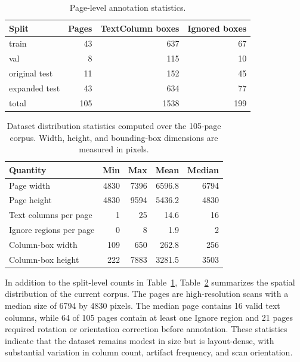 \documentclass[12pt]{article}
\begin{document}
\begin{table}[t]
\centering
\scriptsize\setlength{\tabcolsep}{3pt}
\caption{Page-level annotation statistics.}
\label{tab:data_stats}
\begin{tabular}{lrrr}
\toprule
Split & Pages & TextColumn boxes & Ignored boxes \\
\midrule
train & 43 & 637 & 67 \\
val & 8 & 115 & 10 \\
original test & 11 & 152 & 45 \\
expanded test & 43 & 634 & 77 \\
\midrule
total & 105 & 1538 & 199 \\
\bottomrule
\end{tabular}
\end{table}


\begin{table}[t]
\centering
\scriptsize\setlength{\tabcolsep}{3pt}
\caption{Dataset distribution statistics computed over the 105-page corpus. Width, height, and bounding-box dimensions are measured in pixels.}
\label{tab:dataset_distribution}
\begin{tabular}{lrrrr}
\toprule
Quantity & Min & Max & Mean & Median \\
\midrule
Page width & 4830 & 7396 & 6596.8 & 6794 \\
Page height & 4830 & 9594 & 5436.2 & 4830 \\
Text columns per page & 1 & 25 & 14.6 & 16 \\
Ignore regions per page & 0 & 8 & 1.9 & 2 \\
Column-box width & 109 & 650 & 262.8 & 256 \\
Column-box height & 222 & 7883 & 3281.5 & 3503 \\
\bottomrule
\end{tabular}
\end{table}

In addition to the split-level counts in Table~\ref{tab:data_stats}, Table~\ref{tab:dataset_distribution} summarizes the spatial distribution of the current corpus. The pages are high-resolution scans with a median size of 6794 by 4830 pixels. The median page contains 16 valid text columns, while 64 of 105 pages contain at least one Ignore region and 21 pages required rotation or orientation correction before annotation. These statistics indicate that the dataset remains modest in size but is layout-dense, with substantial variation in column count, artifact frequency, and scan orientation.
\end{document}
